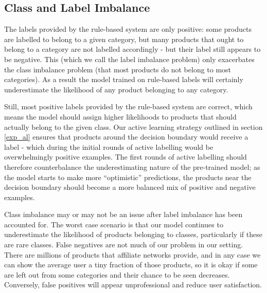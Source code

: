 \subsection{Class and Label Imbalance}
\label{label_imbalance}


The labels provided by the rule-based system are only positive:  some products are labelled to belong to a given category, but many products that ought to belong to a category are not labelled  accordingly -  but their label still appears to be negative.
This (which we call the label imbalance problem) only exacerbates the class imbalance problem (that most products do not belong to most categories).
As a result the model trained on rule-based labels will certainly underestimate the likelihood of any product belonging to any category.

Still, most positive labels provided by the rule-based system are correct, which means the model should assign higher likelihoods to products that should actually belong to the given class.
Our active learning strategy outlined in section \ref{exp_al} ensures that products around the decision boundary would receive a label - which during the initial rounds of active labelling would be overwhelmingly positive examples.
The first rounds of active labelling should therefore counterbalance the underestimating nature of the pre-trained model; as the model starts to make more ``optimistic'' predictions, the products near the decision boundary should become a more balanced mix of positive and negative examples.

Class imbalance may or may not be an issue after label imbalance has been accounted for.
The worst case scenario is that our model continues to underestimate the likelihood of products belonging to classes, particularly if these are rare classes.
False negatives are not much of our problem in our setting.
There are millions of products that affiliate networks provide, and in any case we can show the average user a tiny fraction of those products, so it is okay if some are left out from some categories and their chance to be seen decreases.
Conversely, false positives will appear unprofessional and reduce user satisfaction.

